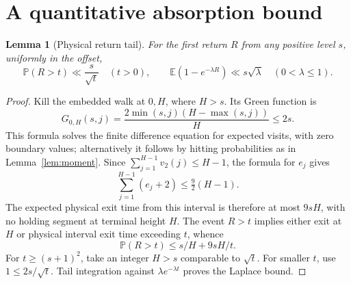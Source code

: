 \documentclass[11pt]{amsart}
\newtheorem{lemma}[theorem]{Lemma}
\theoremstyle{definition}
\theoremstyle{remark}
\newcommand{\E}{\mathbb E}
\newcommand{\PP}{\mathbb P}
\begin{document}
\section{A quantitative absorption bound}\label{sec:tail}
\begin{lemma}[Physical return tail]\label{lem:return-tail}
For the first return $R$ from any positive level $s$, uniformly in the offset,
\[
 \PP(R>t)\ll\frac{s}{\sqrt t}\quad(t>0),\qquad
 \E(1-e^{-\lambda R})\ll s\sqrt\lambda\quad(0<\lambda\le1).
\]
\end{lemma}
\begin{proof}
Kill the embedded walk at $0,H$, where $H>s$. Its Green function is
\[
 G_{0,H}(s,j)=\frac{2\min(s,j)(H-\max(s,j))}{H}\le2s.
\]
This formula solves the finite difference equation for expected visits, with zero boundary values; alternatively it follows by hitting probabilities as in Lemma~\ref{lem:moment}.
Since $\sum_{j=1}^{H-1}v_2(j)\le H-1$, the formula for $e_j$ gives
\[
 \sum_{j=1}^{H-1}(e_j+2)\le\tfrac92(H-1).
\]
The expected physical exit time from this interval is therefore at most $9sH$, with no holding segment at terminal height $H$. The event $R>t$ implies either exit at $H$ or physical interval exit time exceeding $t$, whence
\[
 \PP(R>t)\le s/H+9sH/t.
\]
For $t\ge(s+1)^2$, take an integer $H>s$ comparable to $\sqrt t$. For smaller $t$, use $1\le2s/\sqrt t$. Tail integration against $\lambda e^{-\lambda t}$ proves the Laplace bound.
\end{proof}
\end{document}
